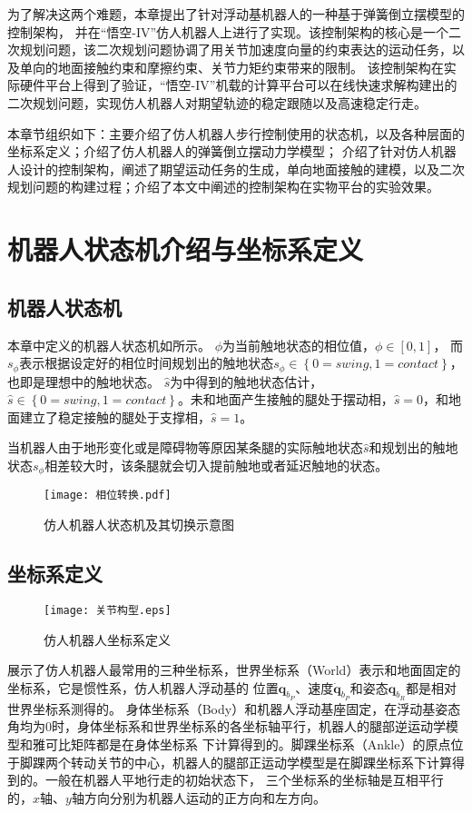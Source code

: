 为了解决这两个难题，本章提出了针对浮动基机器人的一种基于弹簧倒立摆模型的控制架构，
并在“悟空-IV”仿人机器人上进行了实现。该控制架构的核心是一个二次规划问题，该二次规划问题协调了用关节加速度向量的约束表达的运动任务，以及单向的地面接触约束和摩擦约束、关节力矩约束带来的限制。
该控制架构在实际硬件平台上得到了验证，“悟空-IV”机载的计算平台可以在线快速求解构建出的二次规划问题，实现仿人机器人对期望轨迹的稳定跟随以及高速稳定行走。

本章节组织如下：主要介绍了仿人机器人步行控制使用的状态机，以及各种层面的坐标系定义；介绍了仿人机器人的弹簧倒立摆动力学模型；
介绍了针对仿人机器人设计的控制架构，阐述了期望运动任务的生成，单向地面接触的建模，以及二次规划问题的构建过程；介绍了本文中阐述的控制架构在实物平台的实验效果。
\section{机器人状态机介绍与坐标系定义}
\label{sec:state_machine}
\subsection{机器人状态机}
本章中定义的机器人状态机如所示。
$\phi$为当前触地状态的相位值，$\phi \in \left[0, 1\right]$，
而$s_{\phi}$表示根据设定好的相位时间规划出的触地状态$s_{\phi} \in \left\{0=swing, 1=contact\right\}$，
也即是理想中的触地状态。
$\hat s$为中得到的触地状态估计，$\hat s \in \left\{0=swing, 1=contact\right\}$。未和地面产生接触的腿处于摆动相，$\hat s = 0$，和地面建立了稳定接触的腿处于支撑相，$\hat s = 1$。

当机器人由于地形变化或是障碍物等原因某条腿的实际触地状态$\hat s$和规划出的触地状态$s_{\phi}$相差较大时，该条腿就会切入提前触地或者延迟触地的状态。
\begin{figure}[htbp]
    \centering
    \texttt{[image: 相位转换.pdf]}
    \caption{\label{fig:state_machine}仿人机器人状态机及其切换示意图}
\end{figure}
\subsection{坐标系定义}
\begin{figure}[htbp]
    \centering
    \texttt{[image: 关节构型.eps]}
    \caption{\label{fig:coordination}仿人机器人坐标系定义}
\end{figure}
展示了仿人机器人最常用的三种坐标系，世界坐标系（World）表示和地面固定的坐标系，它是惯性系，仿人机器人浮动基的
位置$\boldsymbol{q}_{b_P}$、速度$ \dot {\boldsymbol{q}}_{b_P}$和姿态$\boldsymbol{q}_{b_R}$都是相对世界坐标系测得的。
身体坐标系（Body）和机器人浮动基座固定，在浮动基姿态角均为0时，身体坐标系和世界坐标系的各坐标轴平行，机器人的腿部逆运动学模型和雅可比矩阵都是在身体坐标系
下计算得到的。脚踝坐标系（Ankle）的原点位于脚踝两个转动关节的中心，机器人的腿部正运动学模型是在脚踝坐标系下计算得到的。一般在机器人平地行走的初始状态下，
三个坐标系的坐标轴是互相平行的，$x$轴、$y$轴方向分别为机器人运动的正方向和左方向。

